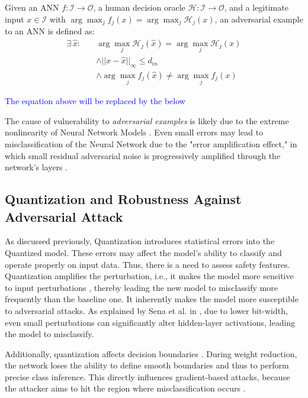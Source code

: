 \begin{definition}\label{definition:adversarial_attack}
Given an ANN $f : \mathcal{I} \to \mathcal{O}$, a human decision oracle $\mathcal{H} : \mathcal I \to \mathcal{O}$, and a legitimate input $x \in \mathcal{I}$ with $\arg \max_j f_j(x) = \arg \max_j \mathcal{H}_j(x)$, an adversarial example to an ANN is defined as:
\begin{equation}
\begin{aligned}
\exists \, \hat{x} : \quad & \arg \max_j \mathcal{H}_j(\hat{x}) = \arg \max_j \mathcal{H}_j(x) \\
& \wedge ||x - \hat{x}||_{\infty} \leq d_{in} \\
& \wedge \arg \max_j f_j(\hat{x}) \neq \arg \max_j f_j(x)
\end{aligned}
\end{equation}
\end{definition}

\textcolor{blue}{The equation above will be replaced by the below}


The cause of vulnerability to \textit{adversarial examples} is likely due to the extreme nonlinearity of Neural Network Models \cite{goodfellowExplainingHarnessingAdversarial2015}. Even small errors may lead to misclassification of the Neural Network due to the "error amplification effect," in which small residual adversarial noise is progressively amplified through the network's layers \cite{liaoDefenseAdversarialAttacks2018}.  

\subsection*{Quantization and Robustness Against Adversarial Attack}
As discussed previously, Quantization introduces statistical errors into the Quantized model. These errors may affect the model's ability to classify and operate properly on input data. Thus, there is a need to assess safety features. Quantization amplifies the perturbation, i.e., it makes the model more sensitive to input perturbations \cite{zhangQEBVerifQuantizationError2023}, thereby leading the new model to misclassify more frequently than the baseline one. It inherently makes the model more susceptible to adversarial attacks. As explained by Sena et al. in \cite{sena2021verifying}, due to lower bit-width, even small perturbations can significantly alter hidden-layer activations, leading the model to misclassify.

Additionally, quantization affects decision boundaries \cite{gorslineAdversarialRobustnessQuantized2021}. During weight reduction, the network loses the ability to define smooth boundaries and thus to perform precise class inference. This directly influences gradient-based attacks, because the attacker aims to hit the region where misclassification occurs \cite{gorslineAdversarialRobustnessQuantized2021}.

